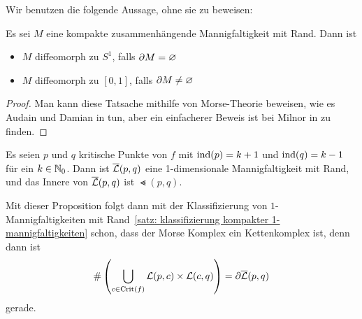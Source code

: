 Wir benutzen die folgende Aussage, ohne sie zu beweisen:

\begin{theorem}
    \label{satz: klassifizierung kompakter 1-mannigfaltigkeiten}
    Es sei $M$ eine kompakte zusammenhängende Mannigfaltigkeit mit Rand. Dann ist
    \begin{itemize}
        \item $M$ diffeomorph zu $S^1$, falls ${ \partial } M = \varnothing$
        \item $M$ diffeomorph zu $[0, 1]$, falls ${ \partial } M \neq \varnothing$
    \end{itemize}
\end{theorem}

\begin{proof}
    Man kann diese Tatsache mithilfe von Morse-Theorie beweisen, wie es Audain und Damian in 
    \cite{audin} tun, aber ein einfacherer Beweis ist bei Milnor in \cite{milnor2} zu finden.
\end{proof}

\begin{theorem}
    \label{satz: gebrochene trajektorien sind 1-dim mannigfaltigkeit}
    Es seien $p$ und $q$ kritische Punkte von $f$ mit ${ \operatorname{ind} } (p) = k + 1$ und ${ \operatorname{ind} } (q) = k - 1$
    für ein $k \in { \mathbb N }_0$. Dann ist ${\overline{\mathcal{L}} } (p, q)$ eine 1-dimensionale Mannigfaltigkeit mit Rand, und das
    Innere von ${\overline{\mathcal{L}} } (p, q)$ ist $\Lt (p, q)$.
\end{theorem}

Mit dieser Proposition folgt dann mit der Klassifizierung von $1$-Mannigfaltigkeiten mit 
Rand~\ref{satz: klassifizierung kompakter 1-mannigfaltigkeiten} schon, dass der Morse Komplex ein
Kettenkomplex ist, denn dann ist 
\[ \# \left( \bigcup_{c \in { \operatorname{Crit} } (f)} { \mathcal{L} } (p, c) \times { \mathcal{L} } (c, q) \right) = { \partial } {\overline{\mathcal{L}} } (p, q) \]
gerade.

